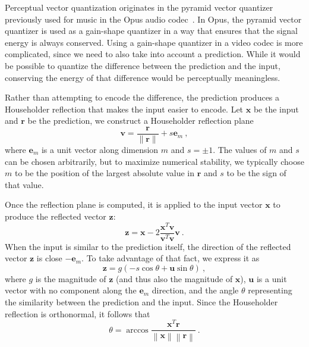 \documentclass[english,conference,10pt]{IEEEtran}
\begin{document}
Perceptual vector quantization originates in the pyramid vector quantizer
previously used for music in the Opus audio codec~\cite{ValinAES}. In Opus,
the pyramid vector quantizer is used as a gain-shape quantizer in a way that
ensures that the signal energy is always conserved. Using a gain-shape
quantizer in a video codec is more complicated, since we need to also take
into account a prediction. While it would be possible to quantize the difference
between the prediction and the input, conserving the energy of that
difference would be perceptually meaningless.

Rather than attempting to encode the difference, the prediction produces
a Householder reflection that makes the input easier to encode. Let 
$\mathbf{x}$ be the input and $\mathbf{r}$ be the prediction, we construct
 a Householder reflection plane
\begin{equation}
\mathbf{v} = \frac{\mathbf{r}}{\|\mathbf{r}\|} + s\mathbf{e}_m\ ,
\end{equation}
where $\mathbf{e}_m$ is a unit vector along dimension $m$ and $s = \pm1$.
The values of $m$ and $s$ can be chosen arbitrarily, but to maximize
numerical stability, we typically choose $m$ to be the position of the
largest absolute value in $\mathbf{r}$ and $s$ to be the sign of that value.

Once the reflection plane is computed, it is applied to the input vector
$\mathbf{x}$ to produce the reflected vector $\mathbf{z}$:
\begin{equation}
\mathbf{z} = \mathbf{x} - 2\frac{\mathbf{x}^T\mathbf{v}}
{\mathbf{v}^T\mathbf{v}}\mathbf{v}\ .
\end{equation}
When the input is similar to the prediction itself, the direction of the
reflected vector $\mathbf{z}$ is close $-\mathbf{e}_m$. To take advantage of
that fact, we express it as
\begin{equation}
\mathbf{z} = g\left(-s\cos\theta + \mathbf{u}\sin\theta\right)\ ,
\end{equation}
where $g$ is the magnitude of $\mathbf{z}$ (and thus also the magnitude of
$\mathbf{x}$), $\mathbf{u}$ is a unit vector with no component along the
$\mathbf{e}_m$ direction, and the angle $\theta$ representing the
similarity between the prediction and the input. Since the Householder
reflection is orthonormal, it follows that
\begin{equation}
\theta = \arccos\frac{\mathbf{x}^T\mathbf{r}}
                   {\left\|\mathbf{x}\right\|\left\|\mathbf{r}\right\|}\ .
\end{equation}
\end{document}
